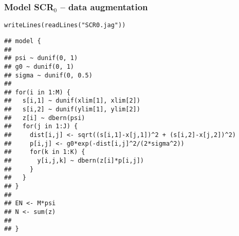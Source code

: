 \documentclass[color=usenames,dvipsnames]{beamer}\usepackage[]{graphicx}\usepackage[]{color}
\makeatletter
\newcommand{\hlstr}[1]{\textcolor[rgb]{0.749,0.012,0.012}{#1}}%
\newcommand{\hlstd}[1]{\textcolor[rgb]{0,0,0}{#1}}%
\newcommand{\hlkwd}[1]{\textcolor[rgb]{0.004,0.004,0.506}{#1}}%
\newenvironment{kframe}{%
 \def\at@end@of@kframe{}%
 \ifinner\ifhmode%
  \def\at@end@of@kframe{\end{minipage}}%
  \begin{minipage}{\columnwidth}%
 \fi\fi%
 \def\FrameCommand##1{\hskip\@totalleftmargin \hskip-\fboxsep
 \colorbox{shadecolor}{##1}\hskip-\fboxsep
     \hskip-\linewidth \hskip-\@totalleftmargin \hskip\columnwidth}%
 \MakeFramed {\advance\hsize-\width
   \@totalleftmargin\z@ \linewidth\hsize
   \@setminipage}}%
 {\par\unskip\endMakeFramed%
 \at@end@of@kframe}
\newenvironment{knitrout}{}{} %
\makeatother
\begin{document}
\begin{frame}[fragile]
  \frametitle{Model SCR$_0$ -- data augmentation}
\vspace{-3pt}
\begin{knitrout}\scriptsize
{}\color{fgcolor}\begin{kframe}
\begin{alltt}
\hlkwd{writeLines}\hlstd{(}\hlkwd{readLines}\hlstd{(}\hlstr{"SCR0.jag"}\hlstd{))}
\end{alltt}
\begin{verbatim}
## model {
## 
## psi ~ dunif(0, 1)
## g0 ~ dunif(0, 1)
## sigma ~ dunif(0, 0.5)
## 
## for(i in 1:M) {
##   s[i,1] ~ dunif(xlim[1], xlim[2])
##   s[i,2] ~ dunif(ylim[1], ylim[2])
##   z[i] ~ dbern(psi)
##   for(j in 1:J) {
##     dist[i,j] <- sqrt((s[i,1]-x[j,1])^2 + (s[i,2]-x[j,2])^2)
##     p[i,j] <- g0*exp(-dist[i,j]^2/(2*sigma^2))
##     for(k in 1:K) {
##       y[i,j,k] ~ dbern(z[i]*p[i,j])
##     }
##   }
## }
## 
## EN <- M*psi
## N <- sum(z)
## 
## }
\end{verbatim}
\end{kframe}
\end{knitrout}
\end{frame}
\end{document}
